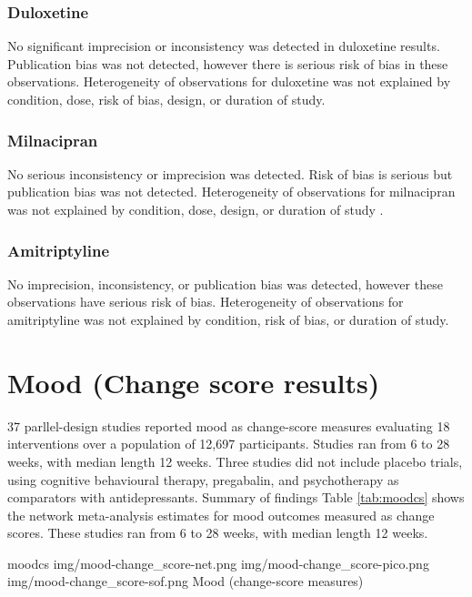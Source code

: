 \documentclass{report}\usepackage[]{graphicx}\usepackage[]{color}
\begin{document}
\subsubsection{Duloxetine}

No significant imprecision or inconsistency was detected in duloxetine results. Publication bias was not detected, however there is serious risk of bias in these observations. Heterogeneity of observations for duloxetine was not explained by condition, dose, risk of bias, design, or duration of study.

\subsubsection{Milnacipran}

No serious inconsistency or imprecision was detected. Risk of bias is serious but publication bias was not detected. Heterogeneity of observations for milnacipran was not explained by condition, dose, design, or duration of study .

\subsubsection{Amitriptyline}

No imprecision, inconsistency, or publication bias was detected, however these observations have serious risk of bias. Heterogeneity of observations for amitriptyline was not explained by condition, risk of bias, or duration of study.



\section{Mood (Change score results)}

37 parllel-design studies reported mood as change-score measures evaluating 18 interventions over a population of 12,697 participants. Studies ran from 6 to 28 weeks, with median length 12 weeks. Three studies did not include placebo trials, using cognitive behavioural therapy, pregabalin, and psychotherapy as comparators with antidepressants. Summary of findings Table \ref{tab:moodcs} shows the network meta-analysis estimates for mood outcomes measured as change scores. These studies ran from 6 to 28 weeks, with median length 12 weeks.

\soffignew
{moodcs}
{img/mood-change_score-net.png}
{img/mood-change_score-pico.png}
{img/mood-change_score-sof.png}
{Mood (change-score measures)}
\end{document}
